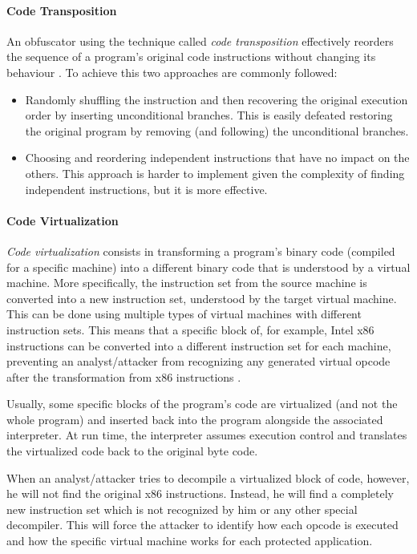 \documentclass[pdfa%
,cucitura%
]{toptesi}
\begin{document}
\paragraph{Code Transposition}
An obfuscator using the technique called \textit{code transposition} effectively reorders the sequence of a program's original code instructions without changing its behaviour \cite{YouMalwareOT}. To achieve this two approaches are commonly followed:
\begin{itemize}
	\item Randomly shuffling the instruction and then recovering the original execution order by inserting unconditional branches. This is easily defeated restoring the original program by removing (and following) the unconditional branches.
	
	\item Choosing and reordering independent instructions that have no impact on the others. This approach is harder to implement given the complexity of finding independent instructions, but it is more effective.
\end{itemize}

\paragraph{Code Virtualization}
\textit{Code virtualization} consists in transforming a program's binary code (compiled for a specific machine) into a different binary code that is understood by a virtual machine. More specifically, the instruction set from the source machine is converted into a new instruction set, understood by the target virtual machine. This can be done using multiple types of virtual machines with different instruction sets. This means that a specific block of, for example, Intel x86 instructions can be converted into a different instruction set for each machine, preventing an analyst/attacker from recognizing any generated virtual opcode after the transformation from x86 instructions \cite{DangPRE}. 

Usually, some specific blocks of the program's code are virtualized (and not the whole program) and inserted back into the program alongside the associated interpreter. At run time, the interpreter assumes execution control and translates the virtualized code back to the original byte code.

When an analyst/attacker tries to decompile a virtualized block of code, however, he will not find the original x86 instructions. Instead, he will find a completely new instruction set which is not recognized by him or any other special decompiler. This will force the attacker to identify how each opcode is executed and how the specific virtual machine works for each protected application. 
\end{document}
